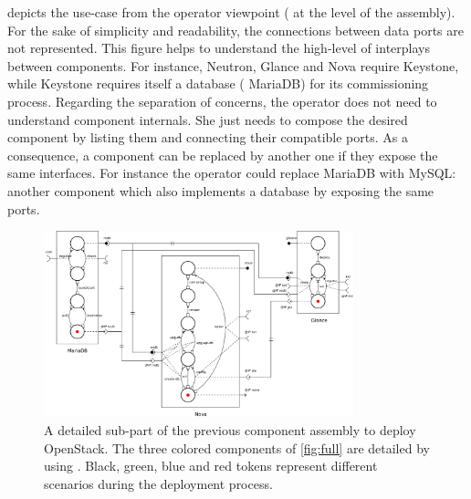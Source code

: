  depicts the use-case from the operator viewpoint (\ie
at the level of the \mad assembly). For the sake of simplicity and
readability, the connections between data ports are not
represented. This figure helps to understand the high-level of
interplays between components. For instance, Neutron, Glance and Nova
require Keystone, while Keystone requires itself a database (\ie
MariaDB) for its commissioning process.
Regarding the separation of concerns, the operator does not need to
understand component internals. She just needs to compose the desired
component by listing them and connecting their compatible ports. As a
consequence, a component can be replaced by another one if they expose
the same interfaces. For instance the operator could replace MariaDB
with MySQL: another component which also implements a database by
exposing the same ports.

\begin{figure}[t]
  \begin{center}
    \includegraphics[width=0.8\textwidth]{./images/sub.pdf}
    \caption{A detailed sub-part of the previous component assembly to deploy
    OpenStack. The three colored components of \cref{fig:full} are detailed by
    using \mad. Black, green, blue and red tokens represent different scenarios
    during the deployment process.}
    \label{fig:sub}
  \end{center}
\end{figure}

